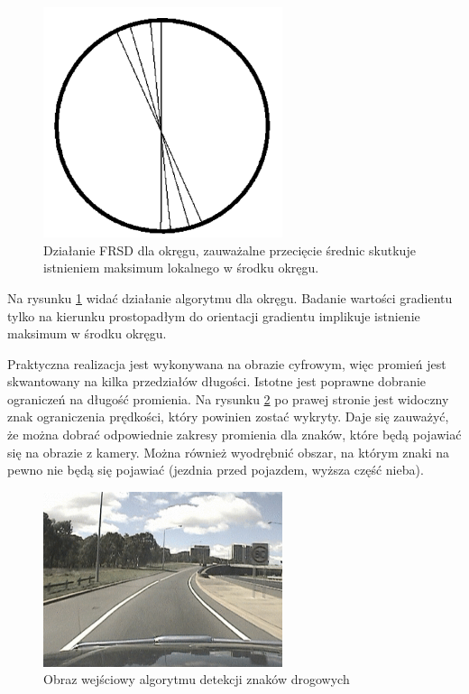 \begin{figure}
  \centering
  \includegraphics[width=7cm]{img/fsrd2.png}
  \caption{Działanie FRSD dla okręgu, zauważalne przecięcie średnic skutkuje istnieniem maksimum lokalnego w środku okręgu.\cite{T2}} %
  \label{fig:frsd2}
\end{figure}
Na rysunku \ref{fig:frsd2} widać działanie algorytmu dla okręgu. Badanie wartości gradientu tylko na kierunku prostopadłym do orientacji gradientu implikuje istnienie maksimum w środku okręgu.


Praktyczna realizacja jest wykonywana na obrazie cyfrowym, więc promień jest skwantowany na kilka przedziałów długości. %
Istotne jest poprawne dobranie ograniczeń na długość promienia. 
Na rysunku \ref{fig:tsd} po prawej stronie jest widoczny znak ograniczenia prędkości, który powinien zostać wykryty. 
Daje się zauważyć, że można dobrać odpowiednie zakresy promienia dla znaków, które będą pojawiać się na obrazie z kamery. Można również wyodrębnić obszar, na którym znaki na pewno nie będą się pojawiać (jezdnia przed pojazdem, wyższa część nieba). %
\begin{figure}
  \centering
  \includegraphics[width=7cm]{img/znaki1.png}
  \caption{Obraz wejściowy algorytmu detekcji znaków drogowych\cite{T2}}
  \label{fig:tsd}
\end{figure}

